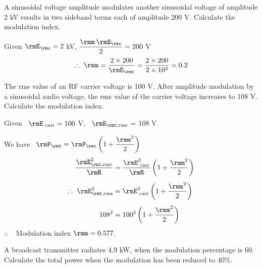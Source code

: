 \eject

\begin{problem}\label{prob8.7}
A sinusoidal voltage amplitude modulates another sinusoidal voltage of
amplitude 2 kV results in two sideband terms each of amplitude 200
V. Calculate the modulation index.
\end{problem}

\begin{solution}
Given $\rmE_\rmc  = 2$ kV, \; $\dfrac{\rmm \,\rmE_\rmc}{2} = 200$ V
$$
\therefore ~ \rmm = \frac{2 \times 200}{\rmE_\rmc} = \frac{2 \times 200}{2 \times 10^3} = 0.2
$$
\end{solution}

\begin{problem}\label{prob8.8}
The rms value of an RF carrier voltage is 100 V. After amplitude
modulation by a sinusoidal audio voltage, the rms value of the carrier
voltage increases to 108 V. Calculate the modulation index.
\end{problem}

\begin{solution}
Given ~$\rmE_{\text{ carr}} = 100$ V, ~$\rmE_{\rmt,\text{rms}}$ = 108 V

\smallskip
We have ~$\rmP_\rmt = \rmP_\rmc \left(1 + \dfrac{\rmm^2}{2} \right)$
\begin{align*}
\frac{\rmE^2_{\rmt,\text{rms}}}{\rmR} & = \frac{\rmE^2_{\text{
carr}}}{\rmR} \left(1 + \frac{\rmm^2}{2} \right)\\[4pt]
\therefore ~ \rmE^2_{\rmt,\text{rms}} & =
\rmE^2_{\text{ carr}} \left(1+\frac{\rmm^2}{2} \right)\\[4pt]
108^2 & = 100^2 \left(1+\frac{\rmm^2}{2} \right)
\end{align*}
$\therefore$ ~ Modulation index  $\rmm = 0.577$.
\end{solution}

\begin{problem}\label{prob8.9}
A broadcast transmitter radiates 4.9 kW, when the modulation
percentage is 60. Calculate the total power when the modulation has
been reduced to 40\%.
\end{problem}

